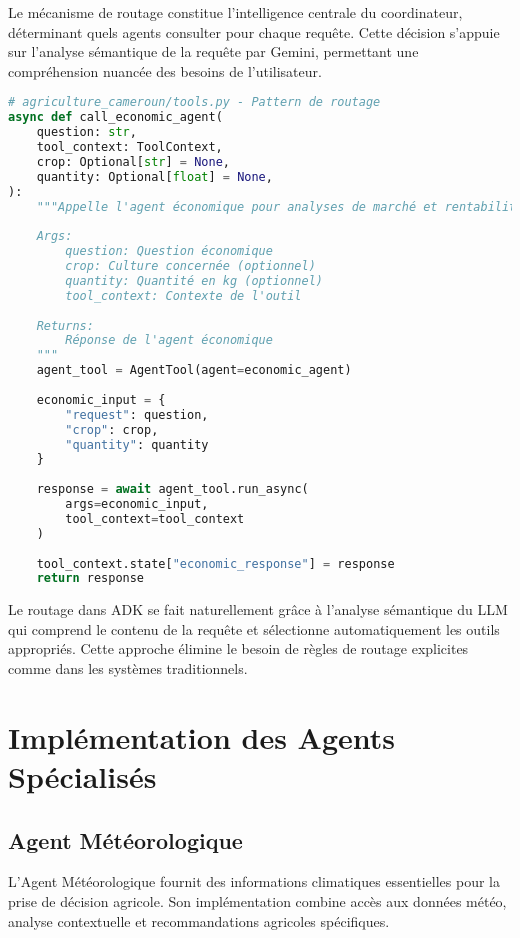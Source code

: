 Le mécanisme de routage constitue l'intelligence centrale du coordinateur, déterminant quels agents consulter pour chaque requête. Cette décision s'appuie sur l'analyse sémantique de la requête par Gemini, permettant une compréhension nuancée des besoins de l'utilisateur.

 
\begin{lstlisting}[language=Python, caption=Routage intelligent vers les agents]
# agriculture_cameroun/tools.py - Pattern de routage
async def call_economic_agent(
    question: str,
    tool_context: ToolContext,
    crop: Optional[str] = None,
    quantity: Optional[float] = None,
):
    """Appelle l'agent économique pour analyses de marché et rentabilité.
    
    Args:
        question: Question économique
        crop: Culture concernée (optionnel)
        quantity: Quantité en kg (optionnel)
        tool_context: Contexte de l'outil
    
    Returns:
        Réponse de l'agent économique
    """
    agent_tool = AgentTool(agent=economic_agent)
    
    economic_input = {
        "request": question,
        "crop": crop,
        "quantity": quantity
    }
    
    response = await agent_tool.run_async(
        args=economic_input,
        tool_context=tool_context
    )
    
    tool_context.state["economic_response"] = response
    return response
\end{lstlisting}

Le routage dans ADK se fait naturellement grâce à l'analyse sémantique du LLM qui comprend le contenu de la requête et sélectionne automatiquement les outils appropriés. Cette approche élimine le besoin de règles de routage explicites comme dans les systèmes traditionnels.

\section{Implémentation des Agents Spécialisés}

\subsection{Agent Météorologique}

L'Agent Météorologique fournit des informations climatiques essentielles pour la prise de décision agricole. Son implémentation combine accès aux données météo, analyse contextuelle et recommandations agricoles spécifiques.

